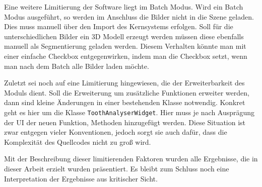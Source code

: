 Eine weitere Limitierung der Software liegt im Batch Modus. Wird ein Batch Modus
ausgeführt, so werden im Anschluss die Bilder nicht in die Szene geladen. Dies muss
manuell über den Import des Kernsystems erfolgen. Soll für die unterschiedlichen
Bilder ein \ac{3D} Modell erzeugt werden müssen diese ebenfalls manuell als Segmentierung
geladen werden. Diesem Verhalten könnte man mit einer einfache Checkbox
entgegenwirken, indem man die Checkbox setzt, wenn man nach dem Batch alle
Bilder laden möchte.

Zuletzt sei noch auf eine Limitierung hingewiesen, die der Erweiterbarkeit des Moduls
dient. Soll die Erweiterung um zusätzliche Funktionen erweiter werden, dann sind
kleine Änderungen in einer bestehenden Klasse notwendig. Konkret geht es hier um
die Klasse \texttt{ToothAnalyserWidget}. Hier muss je nach Ausprägung der \ac{UI}
der neuen Funktion, Methoden hinzugefügt werden. Diese Situation ist zwar entgegen
vieler Konventionen, jedoch sorgt sie auch dafür, dass die Komplexität des Quellcodes
nicht zu groß wird.

Mit der Beschreibung dieser limitierenden Faktoren wurden alle Ergebnisse, die
in dieser Arbeit erzielt wurden präsentiert. Es bleibt zum Schluss noch eine Interpretation
der Ergebnisse aus kritischer Sicht.
